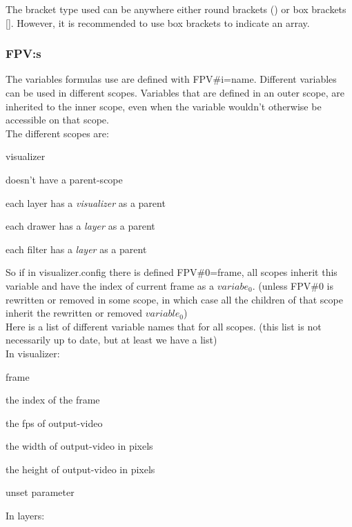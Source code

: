 \documentclass{article}
\begin{document}
      The bracket type used can be anywhere either round brackets () or box brackets []. However, it is recommended to use box brackets to
      indicate an array.
      \subsubsection{FPV:s}
      The variables formulas use are defined with FPV\#i=name. Different variables can be used in different scopes. Variables that
      are defined in an outer scope, are inherited to the inner scope, even when the variable wouldn't otherwise be accessible
      on that scope. \\
      The different scopes are: \\
      \begin{labeling}{visualizer}
        \item[visualizer] doesn't have a parent-scope
        \item[layer]      each layer has a \textit{visualizer} as a parent
        \item[drawer]     each drawer has a \textit{layer} as a parent
        \item[filter]     each filter has a \textit{layer} as a parent
      \end{labeling}
      So if in visualizer.config there is defined FPV\#0=frame, all scopes inherit this variable and have the index of current 
      frame as a $variabe_0$. (unless FPV\#0 is rewritten or removed in some scope, in which case all the children of that scope
      inherit the rewritten or removed $variable_0$) \\
      Here is a list of different variable names that for all scopes.
      (this list is not necessarily up to date, but at least we have a list)
      \\
      In visualizer: \\
      \begin{labeling}{frame}
        \item[frame]    the index of the frame
        \item[fps]      the fps of output-video
        \item[w]        the width of output-video in pixels
        \item[h]        the height of output-video in pixels 
        \item[null]     unset parameter
      \end{labeling}
      In layers: \\
\end{document}
